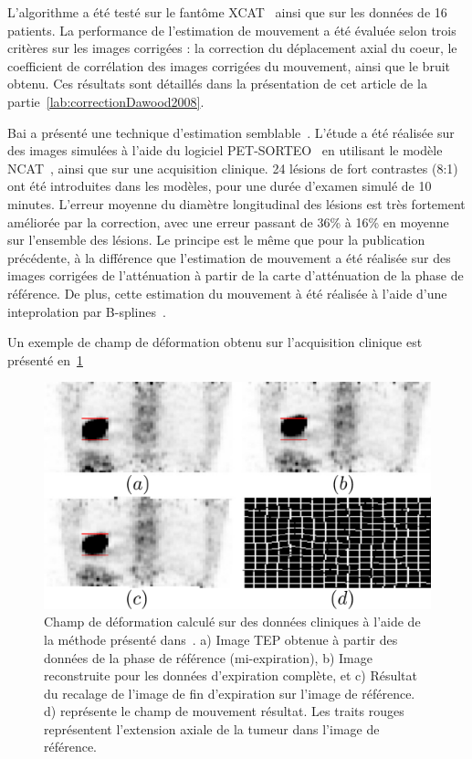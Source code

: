 L'algorithme a été testé sur le fantôme XCAT~\cite{segars2009mcatoverview} ainsi que sur les données de 16 patients. La performance de l'estimation de mouvement a été évaluée selon trois critères sur les images corrigées : la correction du déplacement axial du coeur, le coefficient de corrélation des images corrigées du mouvement, ainsi que le bruit obtenu. Ces résultats sont détaillés dans la présentation de cet article de la partie~\ref{lab:correctionDawood2008}.

Bai a présenté une technique d'estimation semblable~\cite{bai2009regularized}. L'étude a été réalisée sur des images simulées à l'aide du logiciel PET-SORTEO~\cite{reilhac2005pet} en utilisant le modèle NCAT~\cite{segars2009mcatoverview}, ainsi que sur une acquisition clinique. 24 lésions de fort contrastes (8:1) ont été introduites dans les modèles, pour une durée d'examen simulé de 10 minutes. L'erreur moyenne du diamètre longitudinal des lésions est très fortement améliorée par la correction, avec une erreur passant de 36\% à 16\% en moyenne sur l'ensemble des lésions. Le principe est le même que pour la publication précédente, à la différence que l'estimation de mouvement a été réalisée sur des images corrigées de l'atténuation à partir de la carte d'atténuation de la phase de référence. De plus, cette estimation du mouvement à été réalisée à l'aide d'une inteprolation par B-splines~\cite{thevenaz2000optimization}.

Un exemple de champ de déformation obtenu sur l'acquisition clinique est présenté en~\ref{fig:champMouvementBai}

\begin{figure}[h!]
	\begin{center}
		\includegraphics[width=12cm]{images/champDeformBai2}
	\end{center}
	\caption[Exemple de champ de mouvement]{Champ de déformation calculé sur des données cliniques à l'aide de la méthode présenté dans~\cite{bai2009regularized}. a) Image TEP obtenue à partir des données de la phase de référence  (mi-expiration), b) Image reconstruite pour les données d'expiration complète, et c) Résultat du recalage de l'image de fin d'expiration sur l'image de référence. d) représente le champ de mouvement résultat. Les traits rouges représentent l'extension axiale de la tumeur dans l'image de référence.} 
	\label{fig:champMouvementBai}
\end{figure}

